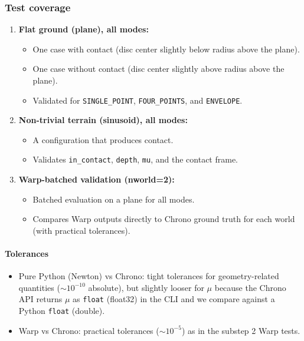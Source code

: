 \subsubsection{Test coverage}
\begin{enumerate}
  \item \textbf{Flat ground (plane), all modes:}
    \begin{itemize}
      \item One case with contact (disc center slightly below radius above the plane).
      \item One case without contact (disc center slightly above radius above the plane).
      \item Validated for \texttt{SINGLE\_POINT}, \texttt{FOUR\_POINTS}, and \texttt{ENVELOPE}.
    \end{itemize}

  \item \textbf{Non-trivial terrain (sinusoid), all modes:}
    \begin{itemize}
      \item A configuration that produces contact.
      \item Validates \texttt{in\_contact}, \texttt{depth}, \texttt{mu}, and the contact frame.
    \end{itemize}

  \item \textbf{Warp-batched validation (nworld=2):}
    \begin{itemize}
      \item Batched evaluation on a plane for all modes.
      \item Compares Warp outputs directly to Chrono ground truth for each world (with practical tolerances).
    \end{itemize}
\end{enumerate}

\paragraph{Tolerances}
\begin{itemize}
  \item Pure Python (Newton) vs Chrono: tight tolerances for geometry-related quantities (\(\sim 10^{-10}\) absolute),
        but slightly looser for \(\mu\) because the Chrono API returns \(\mu\) as \texttt{float} (float32) in the CLI
        and we compare against a Python \texttt{float} (double).
  \item Warp vs Chrono: practical tolerances (\(\sim 10^{-5}\)) as in the substep 2 Warp tests.
\end{itemize}

